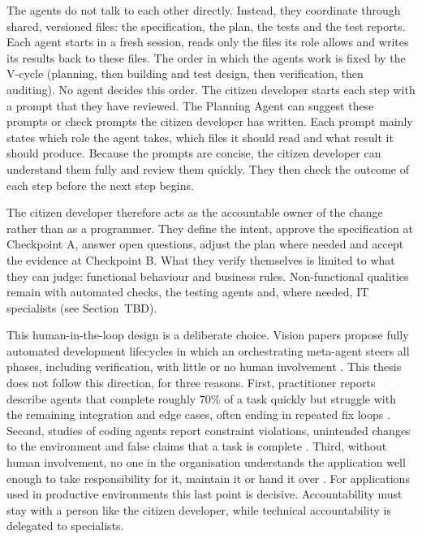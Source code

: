 \documentclass[10pt,a4paper]{article}
\begin{document}
The agents do not talk to each other directly. Instead, they coordinate through shared, versioned files: the specification, the plan, the tests and the test reports. Each agent starts in a fresh session, reads only the files its role allows and writes its results back to these files. The order in which the agents work is fixed by the V-cycle (planning, then building and test design, then verification, then auditing). No agent decides this order. The citizen developer starts each step with a prompt that they have reviewed. The Planning Agent can suggest these prompts or check prompts the citizen developer has written. Each prompt mainly states which role the agent takes, which files it should read and what result it should produce. Because the prompts are concise, the citizen developer can understand them fully and review them quickly. They then check the outcome of each step before the next step begins.


The citizen developer therefore acts as the accountable owner of the change rather than as a programmer. They define the intent, approve the specification at Checkpoint A, answer open questions, adjust the plan where needed and accept the evidence at Checkpoint B. What they verify themselves is limited to what they can judge: functional behaviour and business rules. Non-functional qualities remain with automated checks, the testing agents and, where needed, IT specialists (see Section~TBD).

This human-in-the-loop design is a deliberate choice. Vision papers propose fully automated development lifecycles in which an orchestrating meta-agent steers all phases, including verification, with little or no human involvement \parencite{maes2026}. This thesis does not follow this direction, for three reasons. First, practitioner reports describe agents that complete roughly 70\% of a task quickly but struggle with the remaining integration and edge cases, often ending in repeated fix loops \parencite{osmani2024, rezun2026}. Second, studies of coding agents report constraint violations, unintended changes to the environment and false claims that a task is complete \parencite{alhasan2026, uddin2026}. Third, without human involvement, no one in the organisation understands the application well enough to take responsibility for it, maintain it or hand it over \parencite{ginac2026, mitchell2026}. For applications used in productive environments this last point is decisive. Accountability must stay with a person like the citizen developer, while technical accountability is delegated to specialists.
\end{document}
